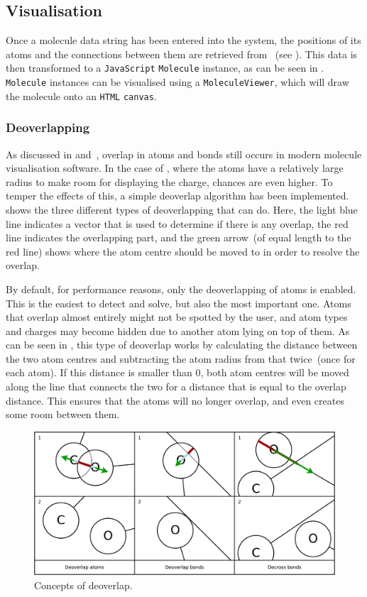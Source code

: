 \subsection{Visualisation}
Once a molecule data string has been entered into the system, the positions of its atoms and the connections between them are retrieved from \oapoc~(see ). This data is then transformed to a \verb|JavaScript| \verb|Molecule| instance, as can be seen in . \verb|Molecule| instances can be visualised using a \verb|MoleculeViewer|, which will draw the molecule onto an \verb|HTML| \verb|canvas|.


\subsubsection{Deoverlapping}
As discussed in  and~\cite{clark2006structure}, overlap in atoms and bonds still occurs in modern molecule visualisation software. In the case of \oframp, where the atoms have a relatively large radius to make room for displaying the charge, chances are even higher. To temper the effects of this, a simple deoverlap algorithm has been implemented.  shows the three different types of deoverlapping that \oframp{} can do. Here, the light blue line indicates a vector that is used to determine if there is any overlap, the red line indicates the overlapping part, and the green arrow~(of equal length to the red line) shows where the atom centre should be moved to in order to resolve the overlap.

By default, for performance reasons, only the deoverlapping of atoms is enabled. This is the easiest to detect and solve, but also the most important one. Atoms that overlap almost entirely might not be spotted by the user, and atom types and charges may become hidden due to another atom lying on top of them. As can be seen in , this type of deoverlap works by calculating the distance between the two atom centres and subtracting the atom radius from that twice~(once for each atom). If this distance is smaller than $0$, both atom centres will be moved along the line that connects the two for a distance that is equal to the overlap distance. This ensures that the atoms will no longer overlap, and even creates some room between them.

\begin{figure}
\center
\includegraphics[width=\textwidth]{img/deoverlap.pdf}
\caption{Concepts of deoverlap.}
\end{figure}

